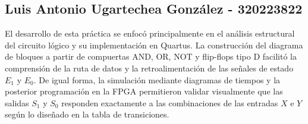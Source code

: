 \documentclass[12pt, letterpaper]{article}
\begin{document}
\subsection*{Luis Antonio Ugartechea González - 320223822}

El desarrollo de esta práctica se enfocó principalmente en el análisis estructural del circuito lógico y su implementación en Quartus. La construcción del diagrama de bloques a partir de compuertas AND, OR, NOT y flip-flops tipo D facilitó la comprensión de la ruta de datos y la retroalimentación de las señales de estado $E_1$ y $E_0$. De igual forma, la simulación mediante diagramas de tiempos y la posterior programación en la FPGA permitieron validar visualmente que las salidas $S_1$ y $S_0$ responden exactamente a las combinaciones de las entradas $X$ e $Y$ según lo diseñado en la tabla de transiciones.

% 
\end{document}

